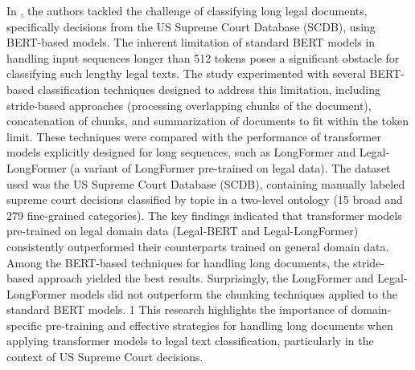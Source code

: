 \documentclass[onecolumn, journal, english, 12pt, a4paper]{IEEEtran} %
\theoremstyle{definition}
\begin{document}
In \cite{Vatsal2023}, the authors tackled the challenge of classifying
long legal documents, specifically decisions from the US Supreme Court
Database (SCDB), using BERT-based models. The inherent limitation of
standard BERT models in handling input sequences longer than 512
tokens poses a significant obstacle for classifying such lengthy legal
texts. The study experimented with several BERT-based classification
techniques designed to address this limitation, including stride-based
approaches (processing overlapping chunks of the document),
concatenation of chunks, and summarization of documents to fit within
the token limit. These techniques were compared with the performance
of transformer models explicitly designed for long sequences, such as
LongFormer and Legal-LongFormer (a variant of LongFormer pre-trained
on legal data).  The dataset used was the US Supreme Court Database
(SCDB), containing manually labeled supreme court decisions classified
by topic in a two-level ontology (15 broad and 279 fine-grained
categories).  The key findings indicated that transformer models
pre-trained on legal domain data (Legal-BERT and Legal-LongFormer)
consistently outperformed their counterparts trained on general domain
data. Among the BERT-based techniques for handling long documents, the
stride-based approach yielded the best results. Surprisingly, the
LongFormer and Legal-LongFormer models did not outperform the chunking
techniques applied to the standard BERT models. 1 This research
highlights the importance of domain-specific pre-training and
effective strategies for handling long documents when applying
transformer models to legal text classification, particularly in the
context of US Supreme Court decisions.
\end{document}
